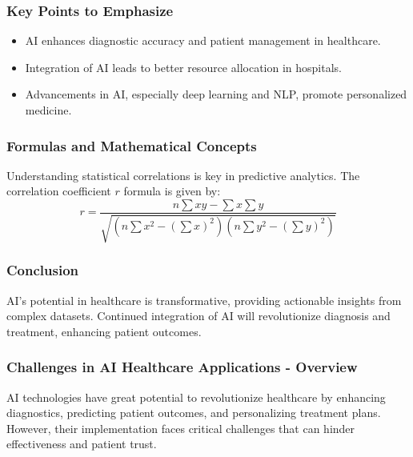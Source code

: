 \documentclass[aspectratio=169]{beamer}
\begin{document}
\begin{frame}[fragile]
    \frametitle{Key Points to Emphasize}
    \begin{itemize}
        \item AI enhances diagnostic accuracy and patient management in healthcare.
        \item Integration of AI leads to better resource allocation in hospitals.
        \item Advancements in AI, especially deep learning and NLP, promote personalized medicine.
    \end{itemize}
\end{frame}

\begin{frame}[fragile]
    \frametitle{Formulas and Mathematical Concepts}
    Understanding statistical correlations is key in predictive analytics. The correlation coefficient \( r \) formula is given by:
    \begin{equation}
        r = \frac{n\sum xy - \sum x \sum y}{\sqrt{(n\sum x^2 - (\sum x)^2)(n\sum y^2 - (\sum y)^2)}}
    \end{equation}
\end{frame}

\begin{frame}[fragile]
    \frametitle{Conclusion}
    \begin{block}{}
        AI's potential in healthcare is transformative, providing actionable insights from complex datasets. Continued integration of AI will revolutionize diagnosis and treatment, enhancing patient outcomes.
    \end{block}
\end{frame}

\begin{frame}[fragile]
    \frametitle{Challenges in AI Healthcare Applications - Overview}
    AI technologies have great potential to revolutionize healthcare by enhancing diagnostics, predicting patient outcomes, and personalizing treatment plans. However, their implementation faces critical challenges that can hinder effectiveness and patient trust.
\end{frame}
\end{document}
